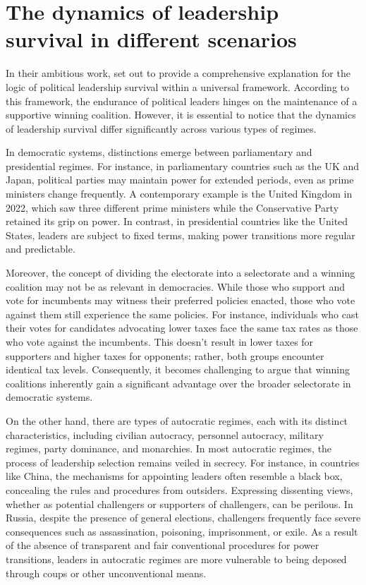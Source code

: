 \documentclass[
  12pt,
  a4paper,
  12pt]{article}
\begin{document}
\hypertarget{the-dynamics-of-leadership-survival-in-different-scenarios}{%
\section{The dynamics of leadership survival in different
scenarios}\label{the-dynamics-of-leadership-survival-in-different-scenarios}}

In their ambitious work, \citet{buenodemesquita2003} set out to provide
a comprehensive explanation for the logic of political leadership
survival within a universal framework. According to this framework, the
endurance of political leaders hinges on the maintenance of a supportive
winning coalition. However, it is essential to notice that the dynamics
of leadership survival differ significantly across various types of
regimes.

In democratic systems, distinctions emerge between parliamentary and
presidential regimes. For instance, in parliamentary countries such as
the UK and Japan, political parties may maintain power for extended
periods, even as prime ministers change frequently. A contemporary
example is the United Kingdom in 2022, which saw three different prime
ministers while the Conservative Party retained its grip on power. In
contrast, in presidential countries like the United States, leaders are
subject to fixed terms, making power transitions more regular and
predictable.

Moreover, the concept of dividing the electorate into a selectorate and
a winning coalition may not be as relevant in democracies. While those
who support and vote for incumbents may witness their preferred policies
enacted, those who vote against them still experience the same policies.
For instance, individuals who cast their votes for candidates advocating
lower taxes face the same tax rates as those who vote against the
incumbents. This doesn't result in lower taxes for supporters and higher
taxes for opponents; rather, both groups encounter identical tax levels.
Consequently, it becomes challenging to argue that winning coalitions
inherently gain a significant advantage over the broader selectorate in
democratic systems.

On the other hand, there are types of autocratic regimes, each with its
distinct characteristics, including civilian autocracy, personnel
autocracy, military regimes, party dominance, and monarchies. In most
autocratic regimes, the process of leadership selection remains veiled
in secrecy. For instance, in countries like China, the mechanisms for
appointing leaders often resemble a black box, concealing the rules and
procedures from outsiders. Expressing dissenting views, whether as
potential challengers or supporters of challengers, can be perilous. In
Russia, despite the presence of general elections, challengers
frequently face severe consequences such as assassination, poisoning,
imprisonment, or exile. As a result of the absence of transparent and
fair conventional procedures for power transitions, leaders in
autocratic regimes are more vulnerable to being deposed through coups or
other unconventional means.
\end{document}
